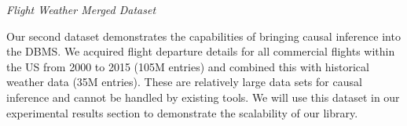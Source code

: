 \begin{example} \em Flight Weather Merged Dataset
\label{ex:flights}


Our second dataset demonstrates the capabilities of bringing causal inference
into the DBMS.
We acquired flight departure details for all commercial flights
within the US from 2000 to 2015 (105M entries)
and combined this with historical weather data (35M entries).
These are relatively large data sets for causal inference and cannot be handled
by existing tools.
We will use this dataset in our experimental results section to demonstrate
the scalability of our library.
\end{example}

